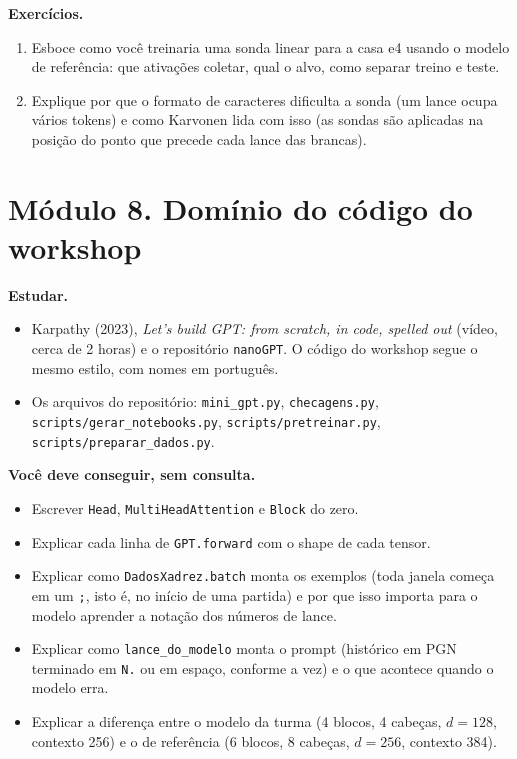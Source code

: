 \documentclass[
  11pt,
]{article}
\providecommand{\tightlist}{%
  \setlength{\itemsep}{0pt}\setlength{\parskip}{0pt}}
\begin{document}
\textbf{Exercícios.}

\begin{enumerate}
\def\labelenumi{\arabic{enumi}.}
\tightlist
\item
  Esboce como você treinaria uma sonda linear para a casa e4 usando o
  modelo de referência: que ativações coletar, qual o alvo, como separar
  treino e teste.
\item
  Explique por que o formato de caracteres dificulta a sonda (um lance
  ocupa vários tokens) e como Karvonen lida com isso (as sondas são
  aplicadas na posição do ponto que precede cada lance das brancas).
\end{enumerate}

\section{Módulo 8. Domínio do código do
workshop}\label{muxf3dulo-8.-domuxednio-do-cuxf3digo-do-workshop}

\textbf{Estudar.}

\begin{itemize}
\tightlist
\item
  Karpathy (2023), \emph{Let's build GPT: from scratch, in code, spelled
  out} (vídeo, cerca de 2 horas) e o repositório \texttt{nanoGPT}. O
  código do workshop segue o mesmo estilo, com nomes em português.
\item
  Os arquivos do repositório: \texttt{mini\_gpt.py},
  \texttt{checagens.py}, \texttt{scripts/gerar\_notebooks.py},
  \texttt{scripts/pretreinar.py}, \texttt{scripts/preparar\_dados.py}.
\end{itemize}

\textbf{Você deve conseguir, sem consulta.}

\begin{itemize}
\tightlist
\item
  Escrever \texttt{Head}, \texttt{MultiHeadAttention} e \texttt{Block}
  do zero.
\item
  Explicar cada linha de \texttt{GPT.forward} com o shape de cada
  tensor.
\item
  Explicar como \texttt{DadosXadrez.batch} monta os exemplos (toda
  janela começa em um \texttt{;}, isto é, no início de uma partida) e
  por que isso importa para o modelo aprender a notação dos números de
  lance.
\item
  Explicar como \texttt{lance\_do\_modelo} monta o prompt (histórico em
  PGN terminado em \texttt{N.} ou em espaço, conforme a vez) e o que
  acontece quando o modelo erra.
\item
  Explicar a diferença entre o modelo da turma (4 blocos, 4 cabeças,
  \(d = 128\), contexto 256) e o de referência (6 blocos, 8 cabeças,
  \(d = 256\), contexto 384).
\end{itemize}
\end{document}
